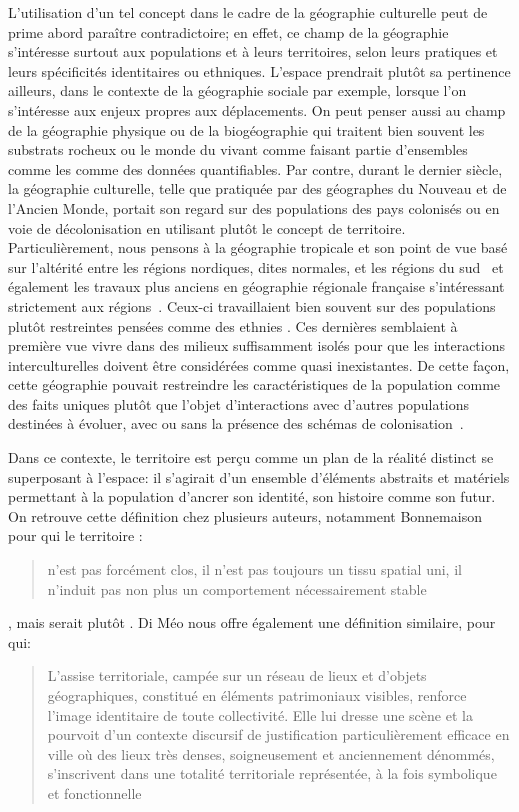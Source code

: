 L'utilisation d'un tel concept dans le cadre de la géographie culturelle peut de prime abord paraître contradictoire; en effet, ce champ de la géographie s'intéresse surtout aux populations et à leurs territoires, selon leurs pratiques et leurs spécificités identitaires ou ethniques.
L'espace prendrait plutôt sa pertinence ailleurs, dans le contexte de la géographie sociale par exemple, lorsque l'on s'intéresse aux enjeux propres aux déplacements.
On peut penser aussi au champ de la géographie physique ou de la biogéographie qui traitent bien souvent les substrats rocheux ou le monde du vivant comme faisant partie d'ensembles comme les  comme des données quantifiables.
Par contre, durant le dernier siècle, la géographie culturelle, telle que pratiquée par des géographes du Nouveau\missref{} et de l'Ancien Monde\missref{}, portait son regard sur des populations des pays colonisés ou en voie de décolonisation en utilisant plutôt le concept de territoire.
Particulièrement, nous pensons à la géographie tropicale et son point de vue basé sur l'altérité entre les régions nordiques, dites normales, et les régions du sud~\citep[493]{Power2009} et également les travaux plus anciens en géographie régionale française s'intéressant strictement aux régions~\citep[31]{Courville1991}.
Ceux-ci travaillaient bien souvent sur des populations plutôt restreintes pensées comme des ethnies .
Ces dernières semblaient à première vue vivre dans des milieux suffisamment isolés pour que les interactions interculturelles doivent être considérées comme quasi inexistantes.
De cette façon, cette géographie pouvait restreindre les caractéristiques de la population comme des faits uniques plutôt que l'objet d'interactions avec d'autres populations destinées à évoluer, avec ou sans la présence des schémas de colonisation~\citep[79--80]{DiMeo2007}.

Dans ce contexte, le territoire est perçu comme un plan de la réalité distinct se superposant à l'espace: il s'agirait d'un ensemble d'éléments abstraits et matériels permettant à la population d'ancrer son identité, son histoire comme son futur.
On retrouve cette définition chez plusieurs auteurs, notamment Bonnemaison pour qui le territoire :
\blockquote[{\cite[253]{Bonnemaison1981}}][.]{n'est pas forcément clos, il n'est pas toujours un tissu spatial uni, il n'induit pas non plus un comportement nécessairement stable}, mais serait plutôt .
Di Méo nous offre également une définition similaire, pour qui:
\blockquote[{\cite[76]{DiMeo2007}}][.]{L’assise territoriale, campée sur un réseau de lieux et d’objets géographiques, constitué en éléments patrimoniaux visibles, renforce l’image identitaire de toute collectivité. Elle lui dresse une scène et la pourvoit d’un contexte discursif de justification particulièrement efficace en ville où des lieux très denses, soigneusement et anciennement dénommés, s’inscrivent dans une totalité territoriale représentée, à la fois symbolique et fonctionnelle}. 

